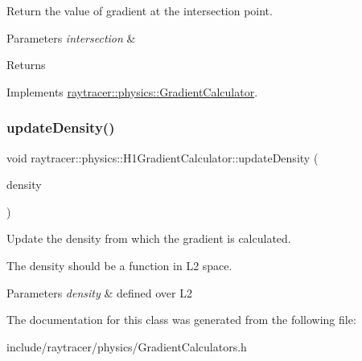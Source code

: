 Return the value of gradient at the intersection point. 


\begin{DoxyParams}{Parameters}
{\em intersection} & \\
\hline
\end{DoxyParams}
\begin{DoxyReturn}{Returns}

\end{DoxyReturn}


Implements \hyperlink{classraytracer_1_1physics_1_1GradientCalculator_aeca43f861f5a5099a42bd8af1550f3dc}{raytracer\+::physics\+::\+Gradient\+Calculator}.

\mbox{\label{classraytracer_1_1physics_1_1H1GradientCalculator_a4959559de8b7285f7d6a2c03e5467a35}} 
\subsubsection{\texorpdfstring{update\+Density()}{updateDensity()}}
{\footnotesize\ttfamily void raytracer\+::physics\+::\+H1\+Gradient\+Calculator\+::update\+Density (\begin{DoxyParamCaption}\item[{mfem\+::\+Grid\+Function \&}]{density }\end{DoxyParamCaption})}



Update the density from which the gradient is calculated. 

The density should be a function in L2 space. 
\begin{DoxyParams}{Parameters}
{\em density} & defined over L2 \\
\hline
\end{DoxyParams}


The documentation for this class was generated from the following file\+:\begin{DoxyCompactItemize}
\item 
include/raytracer/physics/Gradient\+Calculators.\+h\end{DoxyCompactItemize}
